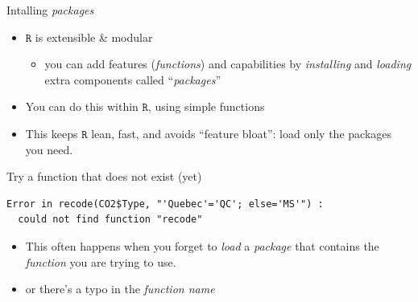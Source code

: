 \documentclass[
  11pt,
  ignorenonframetext,
]{beamer}
\newenvironment{Shaded}{\begin{snugshade}}{\end{snugshade}}
\newcommand{\FunctionTok}[1]{\textcolor[rgb]{0.13,0.29,0.53}{\textbf{#1}}}
\newcommand{\NormalTok}[1]{#1}
\newcommand{\SpecialCharTok}[1]{\textcolor[rgb]{0.81,0.36,0.00}{\textbf{#1}}}
\newcommand{\StringTok}[1]{\textcolor[rgb]{0.31,0.60,0.02}{#1}}
\providecommand{\tightlist}{%
  \setlength{\itemsep}{0pt}\setlength{\parskip}{0pt}}
\newcommand{\R}{\texttt{R}}
\begin{document}
\begin{frame}{Intalling \emph{packages}}
\protect\hypertarget{intalling-packages}{}
\begin{itemize}
\item
  \(\R\) is extensible \& modular

  \begin{itemize}
  \tightlist
  \item
    you can add features (\emph{functions}) and capabilities by
    \emph{installing} and \emph{loading} extra components called
    ``\emph{packages}''
  \end{itemize}
\item
  You can do this within \(\R\), using simple functions
\item
  This keeps \(\R\) lean, fast, and avoids ``feature bloat'': load only
  the packages you need.
\end{itemize}
\end{frame}

\begin{frame}[fragile]{Try a function that does not exist (yet)}
\protect\hypertarget{try-a-function-that-does-not-exist-yet}{}
\begin{Shaded}
\end{Shaded}

\begin{verbatim}
Error in recode(CO2$Type, "'Quebec'='QC'; else='MS'") : 
  could not find function "recode"
\end{verbatim}

\begin{itemize}
\tightlist
\item
  This often happens when you forget to \emph{load} a \emph{package}
  that contains the \emph{function} you are trying to use.
\item
  or there's a typo in the \emph{function name}
\end{itemize}
\end{frame}
\end{document}
